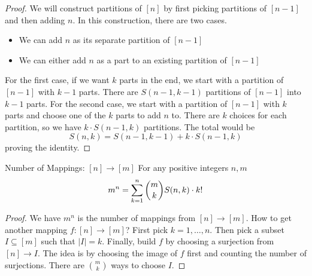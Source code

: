 \documentclass{report}
\begin{document}
\begin{proof}
    We will construct partitions of $[n]$ by first picking partitions of $[n - 1]$ and then adding $n$. In this construction, there are two cases.
        \begin{itemize}
            \item We can add $n$ as its separate partition of $[n - 1]$ 

            \item We can either add $n$ as a part to an existing partition of $[n - 1]$
        \end{itemize}
    For the first case, if we want $k$ parts in the end, we start with a partition of $[n - 1]$ with $k - 1$ parts. There are $S(n - 1, k -1)$ partitions of $[n - 1]$ into $k - 1$ parts. For the second case, we start with a partition of $[n -1]$ with $k$ parts and choose one of the $k$ parts to add $n$ to. There are $k$ choices for each partition, so we have $k \cdot S(n - 1, k)$ partitions. The total would be
        \begin{equation*}
            S(n, k) = S(n - 1, k - 1) + k \cdot S(n - 1, k)
        \end{equation*}
    proving the identity.
\end{proof}

\begin{theorem}{Number of Mappings: $[n] \rightarrow [m]$}
    For any positive integers $n, m$
        \begin{equation*}
            m^{n} = \sum_{k = 1}^{n} \dbinom{m}{k} S(n, k) \cdot k!
        \end{equation*}
\end{theorem}

\begin{proof}
    We have $m^{n}$ is the number of mappings from $[n] \rightarrow [m]$. How to get another mapping $f: [n] \rightarrow [m]$? First pick $k = 1, \ldots , n$. Then pick a subset $I \subseteq [m]$ such that $\lvert I \rvert = k$. Finally, build $f$ by choosing a surjection from $[n] \rightarrow I$. The idea is by choosing the image of $f$ first and counting the number of surjections. There are $\binom{m}{k}$ ways to choose $I$.
\end{proof}
\end{document}
